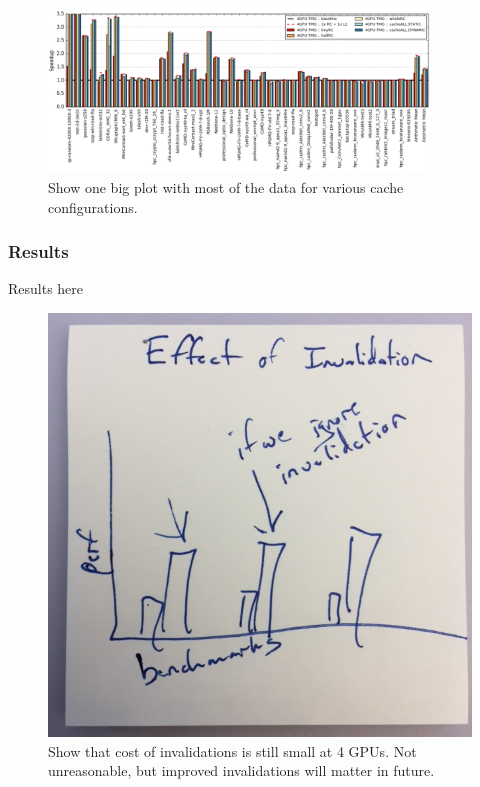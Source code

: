 \begin{figure}[tp]
    \centering
    \includegraphics[width=0.9\textwidth]{figures/caching.jpg}
    \caption{Show one big plot with most of the data for various cache configurations.}
    \label{fig:caching}
\end{figure}


\subsubsection{Results}
Results here

\begin{figure}[tp]
    \centering
    \includegraphics[width=0.9\columnwidth]{figures/invalidations.jpg}
    \caption{Show that cost of invalidations is still small at 4 GPUs.  Not unreasonable, but improved invalidations will matter in future.}
    \label{fig:invalidations}
\end{figure}


